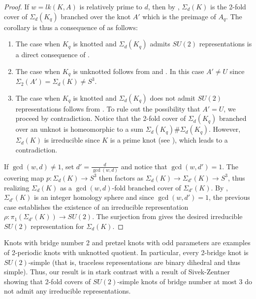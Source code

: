 \documentclass[11pt]{amsart}
\newtheorem{theorem}{Theorem}[section]
\begin{document}
\begin{proof} If $w=lk(K,A)$ is relatively prime to $d$, then by , $\Sigma_d(K)$ is the 2-fold cover of $\Sigma_d(K_q)$ branched over the knot $A'$ which is the preimage of $A_q$. The corollary is thus a consequence of  as follows:
\begin{enumerate}
\item The case when $K_q$ is knotted and $\Sigma_d(K_q)$ admits $SU(2)$ representations is a direct consequence of .
\item The case when $K_q$ is unknotted follows from \cite[Corollary 7.17]{KM-sutures} and \cite[Theorem 3.1]{CNS}. In this case $A'\neq U$ since $\Sigma_2(A')=\Sigma_d(K)\neq S^3$.
\item The case when $K_q$ is knotted and $\Sigma_d(K_q)$ does not admit $SU(2)$ representations follows from  \cite[Theorem 4.1]{smalldehn}. To rule out the possibility that $A'=U$, we proceed by contradiction. Notice that the 2-fold cover of $\Sigma_d(K_q)$ branched over an unknot is homeomorphic to a sum $\Sigma_d(K_q)\# \Sigma_d(K_q)$. However, $\Sigma_d(K)$ is irreducible since $K$ is a prime knot (see \cite{plotnick}), which leads to a contradiction.
\end{enumerate}

If $\gcd(w,d)\neq 1$, set $d'=\tfrac{d}{\gcd(w,d)}$ and notice that $\gcd(w,d')=1$. The covering map $p:\Sigma_d(K)\to S^3$ then factors as $\Sigma_d(K)\to \Sigma_{d'}(K)\to S^3$, thus realizing $\Sigma_d(K)$ as a $\gcd(w,d)$-fold branched cover of $\Sigma_{d'}(K)$. By , $\Sigma_{d'}(K)$ is an integer homology sphere and since $\gcd(w,d')=1$, the previous case establishes the existence of an irreducible representation $\rho:\pi_1\left(\Sigma_{d'}(K)\right)\to SU(2)$. The surjection from  gives the desired irreducible $SU(2)$ representation for $\Sigma_d(K)$.
\end{proof}

Knots with bridge number 2 and pretzel knots with odd parameters are examples of 2-periodic knots with unknotted quotient. In particular, every 2-bridge knot is $SU(2)$-simple (that is, traceless representations are binary dihedral and thus simple). Thus, our result is in stark contrast with a result of Sivek-Zentner \cite{menagerie} showing that 2-fold covers of $SU(2)$-simple knots of bridge number at most 3 do not admit any irreducible representations. \\
\end{document}

